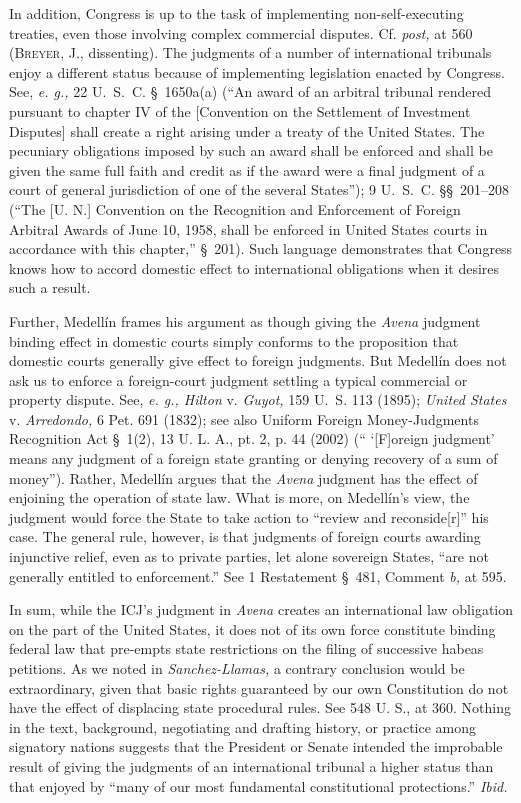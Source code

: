 {  In addition, Congress is up to the task of implementing
non-self-executing treaties, even those involving complex commercial
disputes. Cf. \emph{post,} at 560 (\textsc{Breyer,} J., dissenting). The
judgments of a number of international tribunals enjoy a different
status because of implementing legislation enacted by Congress. See,
\emph{e. g.,} 22 U.~S.~C. \S~1650a(a) (``An award of an arbitral
tribunal rendered pursuant to chapter IV of the [Convention on the
Settlement of Investment Disputes] shall create a right arising under
a treaty of the United States. The pecuniary obligations imposed by
such an award shall be enforced and shall be given the same full
faith and credit as if the award were a final judgment of a court of
general jurisdiction of one of the several States''); 9 U.~S.~C.
\S\S~201--208 (``The [U. N.] Convention on the Recogni\newpage tion
and Enforcement of Foreign Arbitral Awards of June 10, 1958, shall be
enforced in United States courts in accordance with this chapter,''
\S~201). Such language demonstrates that Congress knows how to accord
domestic effect to international obligations when it desires such a
result.\footnotemark[12]

  Further, Medellín frames his argument as though giving the \emph{Avena}
judgment binding effect in domestic courts simply conforms to the
proposition that domestic courts generally give effect to foreign
judgments. But Medellín does not ask us to enforce a foreign-court
judgment settling a typical commercial or property dispute. See,
\emph{e. g., Hilton} v. \emph{Guyot,} 159 U.~S. 113 (1895); \emph{United
States} v. \emph{Arredondo,} 6 Pet. 691 (1832); see also Uniform Foreign
Money-Judgments Recognition Act \S~1(2), 13 U. L. A., pt. 2, p. 44
(2002) (`` ‘[F]oreign judgment' means any judgment of a foreign
state granting or denying recovery of a sum of money''). Rather,
Medellín argues that the \emph{Avena} judgment has the effect of enjoining
the operation of state law. What is more, on Medellín's view,
the judgment would force the State to take action to ``review and
reconside[r]'' his case. The general rule, however, is that judgments
of foreign courts awarding injunctive relief, even as to private
parties, let alone sovereign States, ``are not generally entitled to
enforcement.'' See 1 Restatement \S~481, Comment \emph{b,} at 595.

  In sum, while the ICJ's judgment in \emph{Avena} creates an
international law obligation on the part of the United States, it
does not of its own force constitute binding federal law \newpage 
that pre-empts state restrictions on the filing of successive habeas
petitions. As we noted in \emph{Sanchez-Llamas,} a contrary conclusion
would be extraordinary, given that basic rights guaranteed by our own
Constitution do not have the effect of displacing state procedural
rules. See 548 U. S., at 360. Nothing in the text, background,
negotiating and drafting history, or practice among signatory nations
suggests that the President or Senate intended the improbable result
of giving the judgments of an international tribunal a higher status
than that enjoyed by ``many of our most fundamental constitutional
protections.'' \emph{Ibid.}

}

